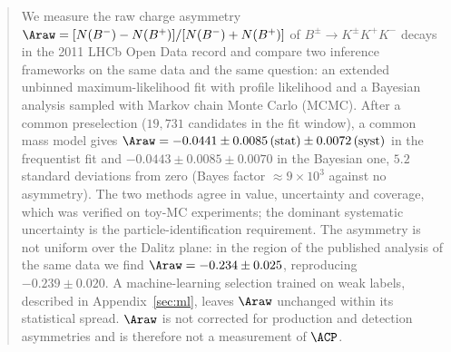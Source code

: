 \begin{abstract}
We measure the raw charge asymmetry $\Araw=[N(B^-)-N(B^+)]/[N(B^-)+N(B^+)]$ of $B^{\pm}\to K^{\pm}K^{+}K^{-}$ decays in the 2011 LHCb Open Data record and compare two inference frameworks on the same data and the same question: an extended unbinned maximum-likelihood fit with profile likelihood and a Bayesian analysis sampled with Markov chain Monte Carlo (MCMC). After a common preselection ($19{,}731$ candidates in the fit window), a common mass model gives $\Araw=-0.0441\pm0.0085\,(\text{stat})\pm0.0072\,(\text{syst})$ in the frequentist fit and $-0.0443\pm0.0085\pm0.0070$ in the Bayesian one, $5.2$ standard deviations from zero (Bayes factor $\approx9\times10^3$ against no asymmetry). The two methods agree in value, uncertainty and coverage, which was verified on toy-MC experiments; the dominant systematic uncertainty is the particle-identification requirement. The asymmetry is not uniform over the Dalitz plane: in the region of the published analysis of the same data we find $\Araw=-0.234\pm0.025$, reproducing $-0.239\pm0.020$. A machine-learning selection trained on weak labels, described in Appendix~\ref{sec:ml}, leaves $\Araw$ unchanged within its statistical spread. $\Araw$ is not corrected for production and detection asymmetries and is therefore not a measurement of $\ACP$.
\end{abstract}
